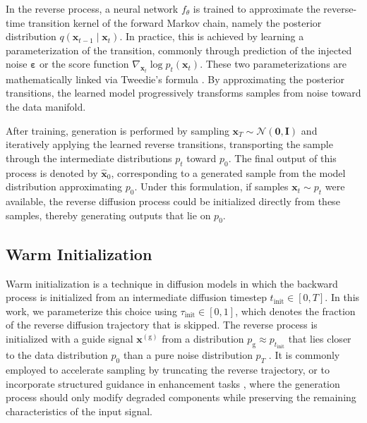 In the reverse process, a neural network $f_\theta$ is trained to approximate the reverse-time transition kernel of the forward Markov chain, namely the posterior distribution $q(\mathbf{x}_{t-1} \mid \mathbf{x}_t)$. In practice, this is achieved by learning a parameterization of the transition, commonly through prediction of the injected noise $\boldsymbol\varepsilon$ or the score function $\nabla_{\mathbf{x}_t} \log p_t(\mathbf{x}_t)$. These two parameterizations are mathematically linked via Tweedie’s formula \cite{efron2011tweedies}. By approximating the posterior transitions, the learned model progressively transforms samples from noise toward the data manifold.

After training, generation is performed by sampling $\mathbf{x}_T \sim \mathcal{N}(\mathbf 0, \mathbf{I})$ and iteratively applying the learned reverse transitions, transporting the sample through the intermediate distributions $p_t$ toward $p_0$. The final output of this process is denoted by $\hat{\mathbf{x}}_0$, corresponding to a generated sample from the model distribution approximating $p_0$. Under this formulation, if samples $\mathbf x_t \sim p_t$ were available, the reverse diffusion process could be initialized directly from these samples, thereby generating outputs that lie on  $p_0$.

\subsection{Warm Initialization}

Warm initialization is a technique in diffusion models in which the backward process is initialized from an intermediate diffusion timestep $t_\text{init} \in [0,T]$. In this work, we parameterize this choice using $\tau_{\text{init}} \in [0,1]$, which denotes the fraction of the reverse diffusion trajectory that is skipped. The reverse process is initialized with a guide signal $\mathbf{x}^{(\mathrm g)}$ from a distribution $p_\mathrm g \approx p_{t_\text{init}}$ that lies closer to the data distribution $p_0$ than a pure noise distribution $p_T$ \cite{scholzWarmStartsAccelerate2025}. It is commonly employed to accelerate sampling by truncating the reverse trajectory, or to incorporate structured guidance in enhancement tasks \cite{moliner2024buddysinglechannelblindunsupervised, moliner2024blindaudiobandwidthextension}, where the generation process should only modify degraded components while preserving the remaining characteristics of the input signal.

